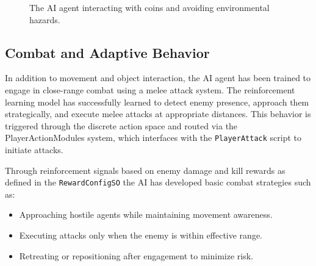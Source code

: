 \documentclass[12pt,oneside,openright,a4paper]{cpe-english-project}
\begin{document}
\begin{figure}[H]
\centering
{}
\caption{The AI agent interacting with coins and avoiding environmental hazards.}
\label{fig:AIInt}
\end{figure}

\subsection{Combat and Adaptive Behavior}

In addition to movement and object interaction, the AI agent has been trained to engage in close-range combat using a melee attack system. The reinforcement learning model has successfully learned to detect enemy presence, approach them strategically, and execute melee attacks at appropriate distances. This behavior is triggered through the discrete action space and routed via the PlayerActionModules system, which interfaces with the \texttt{PlayerAttack} script to initiate attacks.

Through reinforcement signals based on enemy damage and kill rewards as defined in the \texttt{RewardConfigSO} the AI has developed basic combat strategies such as:

\begin{itemize}
\item Approaching hostile agents while maintaining movement awareness.
\item Executing attacks only when the enemy is within effective range.
\item Retreating or repositioning after engagement to minimize risk.
\end{itemize}
\end{document}
